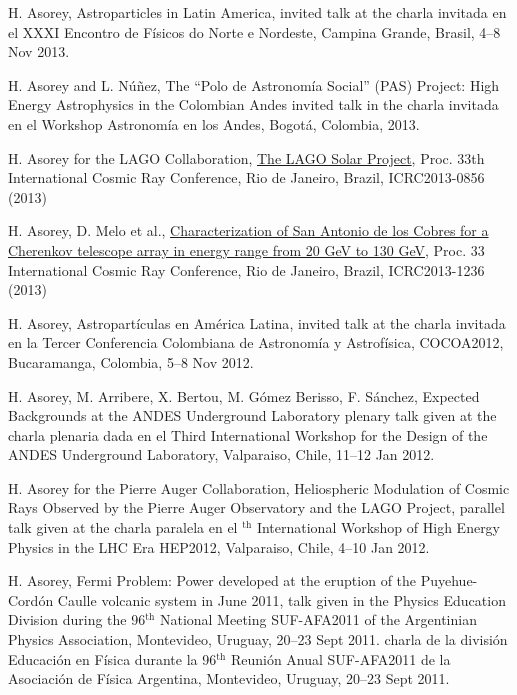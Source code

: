 \begin{etaremune}
\item {} H. Asorey, {{Astroparticles in Latin America}}, 
\ifeng
invited talk at the
\else
charla invitada en el 
\fi
XXXI Encontro de Físicos do Norte e Nordeste, Campina Grande, Brasil, 4--8 Nov 2013.

\item {}H. Asorey and L. Núñez, {{The ``Polo de Astronomía Social'' (PAS) Project: High Energy Astrophysics in the Colombian Andes}} \ifeng invited talk in the \else charla invitada en el \fi Workshop Astronomía en los Andes, Bogotá, Colombia, 2013.

\item {}H. Asorey for the LAGO Collaboration, \href{https://www.cbpf.br/~icrc2013/papers/icrc2013-0856.pdf}{The LAGO Solar Project}, \en Proc. 33th International Cosmic Ray Conference, Rio de Janeiro, Brazil, ICRC2013-0856 (2013)

\item {}H. Asorey, D. Melo {{et al.}}, \href{https://www.cbpf.br/~icrc2013/papers/icrc2013-1236.pdf}{Characterization of San Antonio de los Cobres for a Cherenkov telescope array in energy range from 20 GeV to 130 GeV}, \en Proc. 33 International Cosmic Ray Conference, Rio de Janeiro, Brazil, ICRC2013-1236 (2013)

\item {} H. Asorey, {{Astropartículas en América Latina}}, 
\ifeng
invited talk at the
\else
charla invitada en la 
\fi
Tercer Conferencia Colombiana de Astronomía y Astrofísica, COCOA2012, Bucaramanga, Colombia, 5--8 Nov 2012.

\item {} H. Asorey, M. Arribere, X. Bertou, M. Gómez Berisso, F. Sánchez,
{{Expected Backgrounds at the ANDES Underground Laboratory}}
\ifeng
plenary talk given at the
\else
charla plenaria dada en el
\fi
Third International Workshop for the Design of the ANDES Underground Laboratory, Valparaiso, Chile, 11--12 Jan 2012.

\item {}H. Asorey for the Pierre Auger Collaboration, {{Heliospheric
Modulation of Cosmic Rays Observed by the Pierre Auger Observatory and the LAGO
Project}}, 
\ifeng
parallel talk given at the 
\else
charla paralela en el 
$^{\mathrm{th}}$ International Workshop of High Energy Physics in the LHC Era HEP2012, Valparaiso, Chile, 4--10 Jan 2012.

\item {}H. Asorey, {{Fermi Problem: Power developed at the eruption of the Puyehue-Cordón Caulle volcanic system in June 2011}}, 
\ifeng
talk given in the Physics Education Division during the 96$^{\mathrm{th}}$ National Meeting SUF-AFA2011 of the Argentinian Physics Association, Montevideo, Uruguay, 20--23 Sept 2011.
\else
charla de la división Educación en Física durante la 96$^{\mathrm{th}}$ Reunión Anual SUF-AFA2011 de la Asociación de Física Argentina, Montevideo, Uruguay, 20--23 Sept 2011.
\fi


\end{etaremune}
